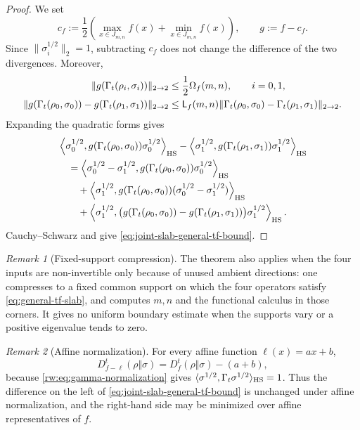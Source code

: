 \documentclass[11pt]{article}
\theoremstyle{remark}
\newtheorem{remark}[remark]{Remark}
\newcommand{\1}{\mathbbm{1}}
\begin{document}
\begin{proof}
We set
\begin{equation}
 c_f:=\frac12\left(
 \max_{x\in J_{m,n}}f(x)+\min_{x\in J_{m,n}}f(x)\right),
 \qquad g:=f-c_f.
\end{equation}
Since $\lVert\sigma_i^{1/2}\rVert_2=1$, subtracting $c_f$ does not
change the difference of the two divergences.  Moreover,
\begin{align}
 \lVert g(\Gamma_t(\rho_i,\sigma_i))\rVert_{2\to2}
 &\leq\frac12\Omega_f(m,n),\qquad i=0,1,\notag\\
 \lVert g(\Gamma_t(\rho_0,\sigma_0))
          -g(\Gamma_t(\rho_1,\sigma_1))\rVert_{2\to2}
 &\leq\mathsf L_f(m,n)
 \lVert\Gamma_t(\rho_0,\sigma_0)
       -\Gamma_t(\rho_1,\sigma_1)\rVert_{2\to2}.
\end{align}
Expanding the quadratic forms gives
\begin{align}
 &\left\langle\sigma_0^{1/2},
   g(\Gamma_t(\rho_0,\sigma_0))\sigma_0^{1/2}
  \right\rangle_{\rm HS}
 -\left\langle\sigma_1^{1/2},
   g(\Gamma_t(\rho_1,\sigma_1))\sigma_1^{1/2}
  \right\rangle_{\rm HS}\notag\\
 &\quad=
 \left\langle\sigma_0^{1/2}-\sigma_1^{1/2},
   g(\Gamma_t(\rho_0,\sigma_0))\sigma_0^{1/2}
 \right\rangle_{\rm HS}\notag\\
 &\qquad
 +\left\langle\sigma_1^{1/2},
   g(\Gamma_t(\rho_0,\sigma_0))
   (\sigma_0^{1/2}-\sigma_1^{1/2})
 \right\rangle_{\rm HS}\notag\\
 &\qquad
 +\left\langle\sigma_1^{1/2},
   \bigl(g(\Gamma_t(\rho_0,\sigma_0))
        -g(\Gamma_t(\rho_1,\sigma_1))\bigr)\sigma_1^{1/2}
 \right\rangle_{\rm HS}.
 \label{eq:general-tf-difference-expansion}
\end{align}
Cauchy--Schwarz and
 give
\eqref{eq:joint-slab-general-tf-bound}.
\end{proof}

\begin{remark}[Fixed-support compression]
The theorem also applies when the four inputs are non-invertible only
because of unused ambient directions: one compresses to a fixed
common support on which the four operators satisfy
\eqref{eq:general-tf-slab}, and computes $m,n$ and the functional
calculus in those corners.  It gives no uniform boundary estimate
when the supports vary or a positive eigenvalue tends to zero.
\end{remark}

\begin{remark}[Affine normalization]
\label{rem:general-tf-affine-normalization}
For every affine function $\ell(x)=ax+b$,
\begin{equation}
 D_{f-\ell}^t(\rho\Vert\sigma)
 =D_f^t(\rho\Vert\sigma)-(a+b),
\end{equation}
because \eqref{rw:eq:gamma-normalization} gives
$\langle\sigma^{1/2},\Gamma_t\sigma^{1/2}\rangle_{\rm HS}=1$.
Thus the difference on the left of
\eqref{eq:joint-slab-general-tf-bound} is unchanged under affine
normalization, and the right-hand side may be minimized over affine
representatives of $f$.
\end{remark}
\end{document}
